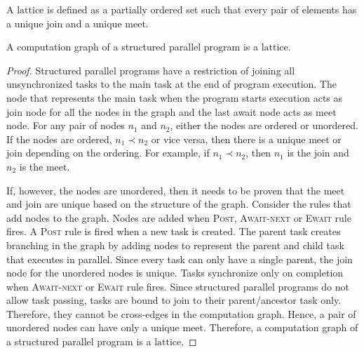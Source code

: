 \begin{definition}
A $\mathrm{lattice}$ is defined as a partially ordered set such that every pair of elements has a unique $\mathrm{join}$ and a unique $\mathrm{meet}$.
\end{definition}

\begin{lemma}
A computation graph of a structured parallel program is a $\mathrm{lattice}$.
\end{lemma}
\begin{proof}
Structured parallel programs have a restriction of joining all unsynchronized tasks to the main task at the end of program execution. The node that represents the main task when the program starts execution acts as $\mathrm{join}$ node for all the nodes in the graph and the last await node acts as $\mathrm{meet}$ node. For any pair of nodes $n_1$ and $n_2$, either the nodes are ordered or unordered. If the nodes are ordered, $n_1 \prec n_2$ or vice versa, then there is a unique $\mathrm{meet}$ or $\mathrm{join}$ depending on the ordering. For example, if $n_1 \prec n_2$, then $n_1$ is the $\mathrm{join}$ and $n_2$ is the $\mathrm{meet}$.  

If, however, the nodes are unordered, then it needs to be proven that the $\mathrm{meet}$ and $\mathrm{join}$ are unique based on the structure of the graph. Consider the rules that add nodes to the graph. Nodes are added when \textsc{Post}, \textsc{Await-next} or \textsc{Ewait} rule fires. A \textsc{Post} rule is fired when a new task is created. The parent task creates branching in the graph by adding nodes to represent the parent and child task that executes in parallel. Since every task can only have a single parent, the $\mathrm{join}$ node for the unordered nodes is unique. Tasks synchronize only on completion when \textsc{Await-next} or \textsc{Ewait} rule fires. Since structured parallel programs do not allow task passing, tasks are bound to join to their parent/ancestor task only. Therefore, they cannot be cross-edges in the computation graph. Hence, a pair of unordered nodes can have only a unique $\mathrm{meet}$. Therefore, a computation graph of a structured parallel program is a $\mathrm{lattice}$.
\end{proof}

